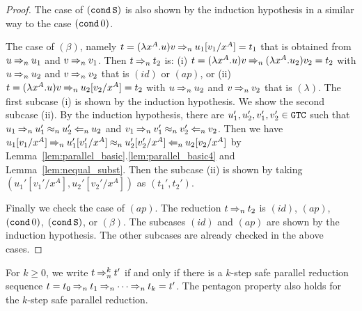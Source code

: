 \begin{proof}
  The case of $({\tt cond}\,{\tt S})$ is also shown by the induction hypothesis in a similar way to the case $({\tt cond}\,0)$.

  The case of $(\beta)$, namely $t = (\lambda x^A.u)v \mathbin{\Rightarrow_{n}} u_1[v_1/x^A] = t_1$ that is 
  obtained from $u \mathbin{\Rightarrow_{n}} u_1$ and $v \mathbin{\Rightarrow_{n}} v_1$.
  Then $t \mathbin{\Rightarrow_{n}} t_2$ is: 
  (i) $t=(\lambda x^A.u)v \mathbin{\Rightarrow_{n}} (\lambda x^A.u_2)v_2 = t_2$
  with $u \mathbin{\Rightarrow_{n}} u_2$ and $v \mathbin{\Rightarrow_{n}} v_2$ that is $(id)$ or $(ap)$, or
  (ii) $t=(\lambda x^A.u)v \mathbin{\Rightarrow_{n}} u_2[v_2/x^A]=t_2$
  with $u \mathbin{\Rightarrow_{n}} u_2$ and $v \mathbin{\Rightarrow_{n}} v_2$ that is $(\lambda)$.
  The first subcase (i) is shown by the induction hypothesis.
  We show the second subcase (ii).
  By the induction hypothesis, there are $u_1', u_2',v_1',v_2' \in {\tt GTC}$ such that  
  $u_1 \mathbin{\Rightarrow_{n}} u_1' \mathbin{\approx_{n}} u_2' \mathbin{\Leftarrow_{n}} u_2$ and
  $v_1 \mathbin{\Rightarrow_{n}} v_1' \mathbin{\approx_{n}} v_2' \mathbin{\Leftarrow_{n}} v_2$.
  Then we have $u_1[v_1/x^A] \mathbin{\Rightarrow_{n}} u_1'[v_1'/x^A] \mathbin{\approx_{n}} u_2'[v_2'/x^A] \mathbin{\Leftarrow_{n}} u_2[v_2/x^A]$ by Lemma~\ref{lem:parallel_basic}.\ref{lem:parallel_basic4} and Lemma~\ref{lem:nequal_subst}. 
  Then the subcase (ii) is shown by taking $(u_1'[v_1'/x^A],u_2'[v_2'/x^A])$ as $(t_1',t_2')$. 
  
  Finally we check the case of $(ap)$.
  The reduction $t \mathbin{\Rightarrow_{n}} t_2$ is $(id)$, $(ap)$, $({\tt cond}\,0)$, $({\tt cond}\,{\tt S})$, or $(\beta)$.
  The subcases $(id)$ and $(ap)$ are shown by the induction hypothesis.
  The other subcases are already checked in the above cases. 
\end{proof}

For $k\ge 0$, we write $t \mathbin{\Rightarrow_{n}^{k}} t'$ if and only if
there is a $k$-step safe parallel reduction sequence
$t=t_0 \mathbin{\Rightarrow_{n}} t_1 \mathbin{\Rightarrow_{n}} \cdots \mathbin{\Rightarrow_{n}} t_k = t'$. 
The pentagon property also holds for the $k$-step safe parallel reduction. 


